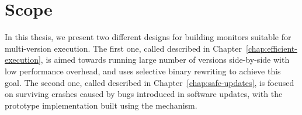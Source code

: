 \section{Scope}
\label{multi-version:scope}

In this thesis, we present two different designs for building monitors suitable
for multi-version execution. The first one, called \varan described in
Chapter~\ref{chap:efficient-execution}, is aimed towards running large number
of versions side-by-side with low performance overhead, and uses selective
binary rewriting to achieve this goal. The second one, called \mx described in
Chapter~\ref{chap:safe-updates}, is focused on surviving crashes caused by bugs
introduced in software updates, with the prototype implementation built using
the \ptrace mechanism.
